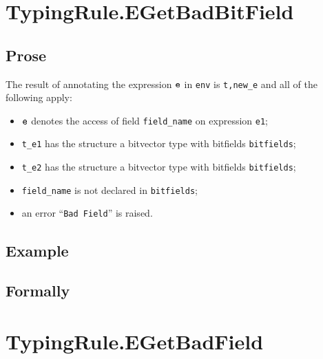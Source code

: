 \documentclass{book}
\begin{document}
\begin{itemize}
\section{TypingRule.EGetBadBitField \label{sec:TypingRule.EGetBadBitField}}

  \subsection{Prose}
  The result of annotating the expression $\texttt{e}$ in \texttt{env} is
\texttt{t,new\_e} and all of the following apply:
  \begin{itemize}
  \item $\texttt{e}$ denotes the access of field \texttt{field\_name} on expression \texttt{e1};
  \item \texttt{t\_e1} has the structure a bitvector type with bitfields \texttt{bitfields};
  \item \texttt{t\_e2} has the structure a bitvector type with bitfields \texttt{bitfields};
  \item \texttt{field\_name} is not declared in \texttt{bitfields};
  \item an error ``\texttt{Bad Field}'' is raised.
  \end{itemize}

  \subsection{Example}



\begin{emptyformal}
    \subsection{Formally}

\end{emptyformal}


\section{TypingRule.EGetBadField \label{sec:TypingRule.EGetBadField}}


\end{itemize}
\end{document}

